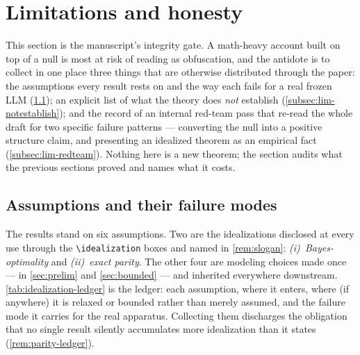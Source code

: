 \section{Limitations and honesty}
\label{sec:limitations}

This section is the manuscript's integrity gate. A math-heavy account built on
top of a null is most at risk of reading
as obfuscation, and the antidote is to collect in one place three things that
are otherwise distributed through the paper: the assumptions every result rests
on and the way each fails for a real frozen LLM (\cref{subsec:lim-assumptions});
an explicit list of what the theory does \emph{not} establish
(\cref{subsec:lim-notestablish}); and the record of an internal red-team pass
that re-read the whole draft for two specific failure patterns --- converting
the null into a positive structure claim, and presenting an idealized theorem as
an empirical fact (\cref{subsec:lim-redteam}). Nothing here is a new theorem; the
section audits what the previous sections proved and names what it costs.

\subsection{Assumptions and their failure modes}
\label{subsec:lim-assumptions}

The results stand on six assumptions. Two are the idealizations disclosed at
every use through the \texttt{\textbackslash idealization} boxes
and named in \cref{rem:slogan}: \emph{(i)~Bayes-optimality} and \emph{(ii)~exact
parity}. The other four are modeling choices made once --- in \cref{sec:prelim}
and \cref{sec:bounded} --- and inherited everywhere downstream.
\cref{tab:idealization-ledger} is the ledger: each assumption, where it enters,
where (if anywhere) it is relaxed or bounded rather than merely assumed, and the
failure mode it carries for the real apparatus. Collecting them discharges the
obligation that no single result silently accumulates more idealization than
it states (\cref{rem:parity-ledger}).

